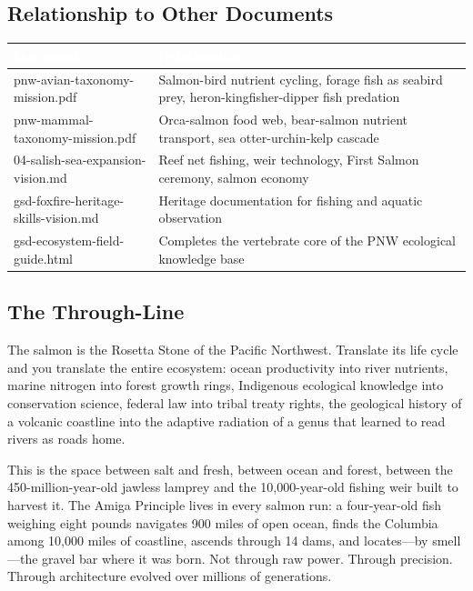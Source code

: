 \documentclass[11pt,letterpaper]{article}
\newcommand{\tableheader}[1]{\textbf{\sffamily\textcolor{white}{#1}}}
\begin{document}
\subsection{Relationship to Other Documents}

\begin{center}
\begin{tabularx}{\textwidth}{L{4.5cm}X}
\toprule
{}
\tableheader{Document} & \tableheader{Relationship} \\
\midrule
pnw-avian-taxonomy-mission.pdf & Salmon-bird nutrient cycling, forage fish as seabird prey, heron-kingfisher-dipper fish predation \\
pnw-mammal-taxonomy-mission.pdf & Orca-salmon food web, bear-salmon nutrient transport, sea otter-urchin-kelp cascade \\
04-salish-sea-expansion-vision.md & Reef net fishing, weir technology, First Salmon ceremony, salmon economy \\
gsd-foxfire-heritage-skills-vision.md & Heritage documentation for fishing and aquatic observation \\
gsd-ecosystem-field-guide.html & Completes the vertebrate core of the PNW ecological knowledge base \\
\bottomrule
\end{tabularx}
\end{center}

\subsection{The Through-Line}

The salmon is the Rosetta Stone of the Pacific Northwest. Translate its life cycle and you translate the entire ecosystem: ocean productivity into river nutrients, marine nitrogen into forest growth rings, Indigenous ecological knowledge into conservation science, federal law into tribal treaty rights, the geological history of a volcanic coastline into the adaptive radiation of a genus that learned to read rivers as roads home.

This is the space between salt and fresh, between ocean and forest, between the 450-million-year-old jawless lamprey and the 10,000-year-old fishing weir built to harvest it. The Amiga Principle lives in every salmon run: a four-year-old fish weighing eight pounds navigates 900 miles of open ocean, finds the Columbia among 10,000 miles of coastline, ascends through 14 dams, and locates---by smell---the gravel bar where it was born. Not through raw power. Through precision. Through architecture evolved over millions of generations.
\end{document}
